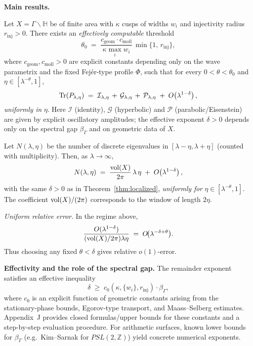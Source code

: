 \medskip
\noindent\textbf{Main results.}
\begin{theorem}\label{thm:localized}
Let $X=\Gamma\backslash\mathbb{H}$ be of finite area with $\kappa$ cusps of
widths $w_i$ and injectivity radius $r_{\mathrm{inj}}>0$.
There exists an \emph{effectively computable} threshold
\[
  \theta_0 \;=\;
  \frac{c_{\mathrm{geom}}\cdot c_{\mathrm{moll}}}{\kappa \max_i w_i}\,
  \min\{1,\,r_{\mathrm{inj}}\},
\]
where $c_{\mathrm{geom}},c_{\mathrm{moll}}>0$ are explicit constants depending
only on the wave parametrix and the fixed Fejér-type profile $\Phi$,
such that for every $0<\theta<\theta_0$ and $\eta\in[\lambda^{-\theta},1]$,
\[
  \operatorname{Tr}(P_{\lambda,\eta})
  \;=\; \mathcal{I}_{\lambda,\eta} \,+\, \mathcal{G}_{\lambda,\eta}
        \,+\, \mathcal{P}_{\lambda,\eta}
        \;+\; O\!\left(\lambda^{1-\delta}\right),
\]
\emph{uniformly in $\eta$}. Here $\mathcal{I}$ (identity), $\mathcal{G}$
(hyperbolic) and $\mathcal{P}$ (parabolic/Eisenstein) are given by explicit
oscillatory amplitudes; the effective exponent $\delta>0$ depends only on
the spectral gap $\beta_\Gamma$ and on geometric data of $X$.
\end{theorem}

\begin{theorem}\label{thm:local-weyl}
Let $N(\lambda,\eta)$ be the number of discrete eigenvalues in
$[\lambda-\eta,\lambda+\eta]$ (counted with multiplicity). Then, as $\lambda\to\infty$,
\[
  N(\lambda,\eta)
  \;=\; \frac{\operatorname{vol}(X)}{2\pi}\,\lambda\,\eta \;+\; O\!\left(\lambda^{1-\delta}\right),
\]
with the same $\delta>0$ as in Theorem~\ref{thm:localized}, \emph{uniformly for}
$\eta\in[\lambda^{-\theta},1]$. The coefficient $\operatorname{vol}(X)/(2\pi)$ corresponds to
the window of length $2\eta$.
\end{theorem}

\noindent\emph{Uniform relative error.} In the regime above,
\[
  \frac{O(\lambda^{1-\delta})}{(\operatorname{vol}(X)/2\pi)\lambda\eta}
  \;=\; O\!\bigl(\lambda^{-\delta+\theta}\bigr).
\]
Thus choosing any fixed $\theta<\delta$ gives relative $o(1)$-error.

\medskip
\noindent\textbf{Effectivity and the role of the spectral gap.}
The remainder exponent satisfies an effective inequality
\[
  \delta \;\ge\; c_0(\kappa,\{w_i\},r_{\mathrm{inj}})\cdot \beta_\Gamma,
\]
where $c_0$ is an explicit function of geometric constants arising from the
stationary-phase bounds, Egorov-type transport, and Maass–Selberg estimates.
Appendix~J provides closed formulas/upper bounds for these constants and a
step-by-step evaluation procedure. For arithmetic surfaces, known lower bounds
for $\beta_\Gamma$ (e.g.\ Kim–Sarnak for $PSL(2,\mathbb{Z})$) yield concrete
numerical exponents.

